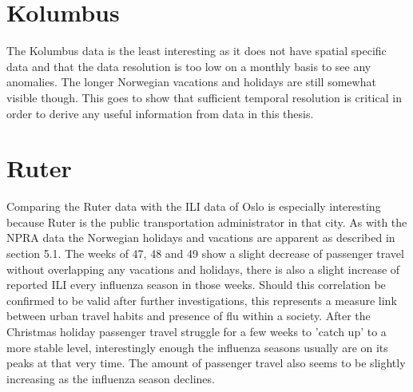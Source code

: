 \section{Kolumbus}
The Kolumbus data is the least interesting as it does not have spatial specific data and that the data resolution is too low on a monthly basis to see any anomalies. The longer Norwegian vacations and holidays are still somewhat visible though. This goes to show that sufficient temporal resolution is critical in order to derive any useful information from data in this thesis.




\section{Ruter}
Comparing the Ruter data with the ILI data of Oslo is especially interesting because Ruter is the public transportation administrator in that city. As with the NPRA data the Norwegian holidays and vacations are apparent as described in section 5.1. The weeks of 47, 48 and 49 show a slight decrease of passenger travel without overlapping any vacations and holidays, there is also a slight increase of reported ILI every influenza season in those weeks. Should this correlation be confirmed to be valid after further investigations, this represents a measure link between urban travel habits and presence of flu within a society.
After the Christmas holiday passenger travel struggle for a few weeks to 'catch up' to a more stable level, interestingly enough the influenza seasons usually are on its peaks at that very time.
The amount of passenger travel also seems to be slightly increasing as the influenza season declines.














